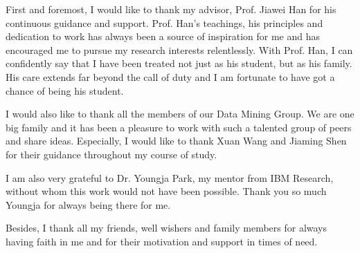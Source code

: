 First and foremost, I would like to thank my advisor, Prof. Jiawei Han for his continuous guidance and support. Prof. Han's teachings, his principles and dedication to work has always been a source of inspiration for me and has encouraged me to pursue my research interests relentlessly. With Prof. Han, I can confidently say that I have been treated not just as his student, but as his family. His care extends far beyond the call of duty and I am fortunate to have got a chance of being his student.

I would also like to thank all the members of our Data Mining Group. We are one big family and it has been a pleasure to work with such a talented group of peers and share ideas. Especially, I would like to thank Xuan Wang and Jiaming Shen for their guidance throughout my course of study.

I am also very grateful to Dr. Youngja Park, my mentor from IBM Research, without whom this work would not have been possible. Thank you so much Youngja for always being there for me.

Besides, I thank all my friends, well wishers and family members for always having faith in me and for their motivation and support in times of need.
